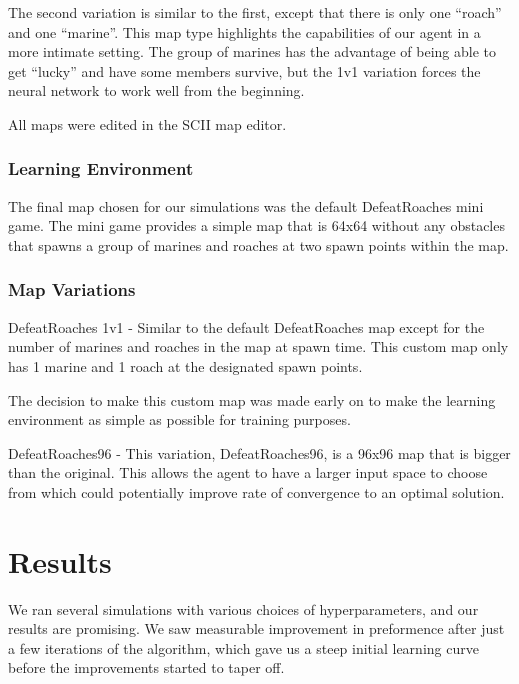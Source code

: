 \documentclass{article}
\begin{document}
\begin{multicols}{2}
The second variation is similar to the first, except that there is only one
``roach'' and one ``marine''. This map type highlights the capabilities of our
agent in a more intimate setting. The group of marines has the advantage of
being able to get ``lucky'' and have some members survive, but the 1v1
variation forces the neural network to work well from the beginning.

All maps were edited in the SCII map editor. 

\subsubsection{Learning Environment}
The final map chosen for our simulations was the default DefeatRoaches mini game. The mini game provides a simple map that is 64x64 without any obstacles that spawns a group of marines and roaches at two spawn points within the map. 

\subsubsection{Map Variations}
DefeatRoaches 1v1 - 
Similar to the default DefeatRoaches map except for the number of marines and 
roaches in the map at spawn time. This custom map only has 1 marine and 1 roach at the designated spawn points. 

The decision to make this custom map was made early on to make the learning environment as simple as possible for training purposes.

DefeatRoaches96 - 
This variation, DefeatRoaches96, is a 96x96 map that is bigger than the original. This allows the agent to have a larger input space to choose from which could potentially improve rate of convergence to an optimal solution. 

\section{Results}
We ran several simulations with various choices of hyperparameters, and our
results are promising. We saw measurable improvement in preformence after just
a few iterations of the algorithm, which gave us a steep initial learning curve
before the improvements started to taper off.


\end{multicols}
\end{document}

